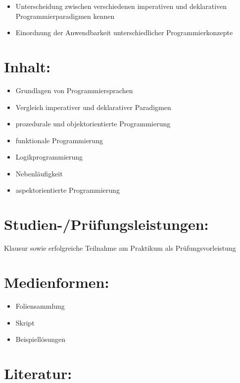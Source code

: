 \begin{itemize}
\tightlist
\item
  Unterscheidung zwischen verschiedenen imperativen und deklarativen
  Programmierparadigmen kennen
\item
  Einordnung der Anwendbarkeit unterschiedlicher Programmierkonzepte
\end{itemize}

\section{Inhalt:}\label{inhalt-17}

\begin{itemize}
\tightlist
\item
  Grundlagen von Programmiersprachen
\item
  Vergleich imperativer und deklarativer Paradigmen
\item
  prozedurale und objektorientierte Programmierung
\item
  funktionale Programmierung
\item
  Logikprogrammierung
\item
  Nebenläufigkeit
\item
  aspektorientierte Programmierung
\end{itemize}

\section{Studien-/Prüfungsleistungen:}\label{studien-pruxfcfungsleistungen-17}

Klausur sowie erfolgreiche Teilnahme am Praktikum als
Prüfungsvorleistung

\section{Medienformen:}\label{medienformen-17}

\begin{itemize}
\tightlist
\item
  Foliensammlung
\item
  Skript
\item
  Beispiellösungen
\end{itemize}

\section{Literatur:}\label{literatur-17}

